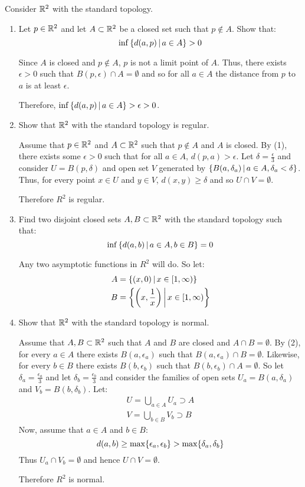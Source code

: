 \documentclass[letterpaper,12pt,fleqn]{article}
\newcommand{\e}{\epsilon}
\renewcommand{\d}{\delta}
\begin{document}
\begin{example}[Exercise 4.6]
  Consider \(\mathbb{R}^2\) with the standard topology.

  \begin{enumerate}
  \item Let \(p\in\mathbb{R}^2\) and let \(A\subset\mathbb{R}^2\) be a closed set such that \(p\notin A\).  Show that:
    \[\inf\left\{{d(a,p)}\,\middle|\,{a\in A}\right\}>0\]

    Since \(A\) is closed and \(p\notin A\), \(p\) is not a limit point of \(A\).  Thus, there exists \(\e>0\) such
    that \(B(p,\e)\cap A=\emptyset\) and so for all \(a\in A\) the distance from \(p\) to \(a\) is at least \(\e\).

    Therefore, \(\inf\setb{d(a,p)}{a\in A}>\e>0\).

  \item Show that \(\mathbb{R}^2\) with the standard topology is regular.

    Assume that \(p\in\mathbb{R}^2\) and \(A\subset\mathbb{R}^2\) such that \(p\notin A\) and \(A\) is closed.  By (1), there
    exists some \(\e>0\) such that for all \(a\in A\), \(d(p,a)>\e\).  Let \(\d=\frac{\e}{3}\) and consider
    \(U=B(p,\d)\) and open set \(V\) generated by \(\setb{B(a,\d_a)}{a\in A,\d_a<\d}\).  Thus, for every point
    \(x\in U\) and \(y\in V\), \(d(x,y)\ge\d\) and so \(U\cap V=\emptyset\).

    Therefore \(R^2\) is regular.

  \item Find two disjoint closed sets \(A,B\subset\mathbb{R}^2\) with the standard topology such that:
    \[\inf\left\{{d(a,b)}\,\middle|\,{a\in A,b\in B}\right\}=0\]

    Any two asymptotic functions in \(R^2\) will do.  So let:
    \begin{align*}
      A &= \left\{{(x,0)}\,\middle|\,{x\in[1,\infty)}\right\} \\
      B &= \left\{{\left(x,\frac{1}{x}\right)}\,\middle|\,{x\in[1,\infty)}\right\}
    \end{align*}

  \item Show that \(\mathbb{R}^2\) with the standard topology is normal.

    Assume that \(A,B\subset\mathbb{R}^2\) such that \(A\) and \(B\) are closed and \(A\cap B=\emptyset\).  By (2), for every
    \(a\in A\) there exists \(B(a,\e_a)\) such that \(B(a,\e_a)\cap B=\emptyset\).  Likewise, for every \(b\in B\)
    there exists \(B(b,\e_b)\) such that \(B(b,\e_b)\cap A=\emptyset\).  So let \(\d_a=\frac{\e_a}{3}\) and let
    \(\d_b=\frac{\e_b}{3}\) and consider the families of open sets \(U_a=B(a,\d_a)\) and \(V_b=B(b,\d_b)\).  Let:
    \begin{align*}
      U=\bigcup_{a\in A}U_a\supset A \\
      V=\bigcup_{b\in B}V_b\supset B
    \end{align*}
    Now, assume that \(a\in A\) and \(b\in B\):
    \[d(a,b)\ge\max\set{\e_a,\e_b}>\max\set{\d_a,\d_b}\]
    Thus \(U_a\cap V_b=\emptyset\) and hence \(U\cap V=\emptyset\).

    Therefore \(R^2\) is normal.
  \end{enumerate}
\end{example}
\end{document}
